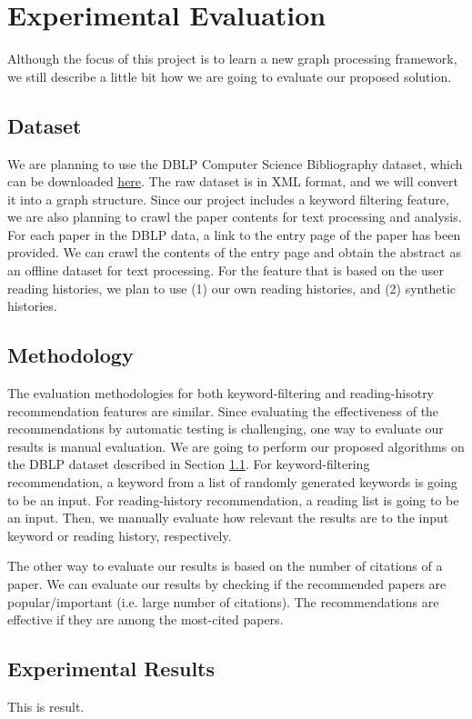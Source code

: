 \section{Experimental Evaluation}
%
Although the focus of this project is to learn a new graph processing framework, we still describe a little bit how we are going to evaluate our proposed solution.
%
\subsection{Dataset} \label{dataset}
%
We are planning to use the DBLP Computer Science Bibliography dataset, which can be downloaded \href{https://dblp.uni-trier.de/xml/}{\underline{here}}.
%
The raw dataset is in XML format, and we will convert it into a graph structure.
%
Since our project includes a keyword filtering feature, we are also planning to crawl the paper contents for text processing and analysis.
%
For each paper in the DBLP data, a link to the entry page of the paper has been provided.
%
We can crawl the contents of the entry page and obtain the abstract as an offline dataset for text processing.
%
For the feature that is based on the user reading histories, we plan to use (1) our own reading histories, and (2) synthetic histories.
%
\subsection{Methodology}
%
The evaluation methodologies for both keyword-filtering and reading-hisotry recommendation features are similar.
%
Since evaluating the effectiveness of the recommendations by automatic testing is challenging, one way to evaluate our results is manual evaluation.
%
We are going to perform our proposed algorithms on the DBLP dataset described in Section \ref{dataset}.
%
For keyword-filtering recommendation, a keyword from a list of randomly generated keywords is going to be an input.
%
For reading-history recommendation, a reading list is going to be an input.
%
Then, we manually evaluate how relevant the results are to the input keyword or reading history, respectively.
%

The other way to evaluate our results is based on the number of citations of a paper.
%
We can evaluate our results by checking if the recommended papers are popular/important (i.e. large number of citations).
%
The recommendations are effective if they are among the most-cited papers.

\subsection{Experimental Results}
%
This is result.
